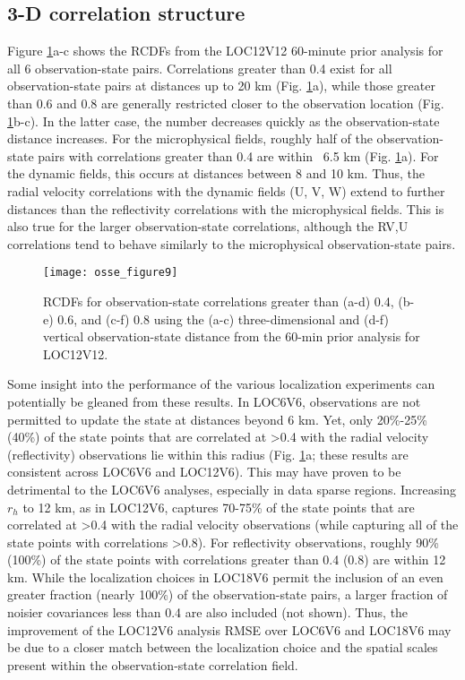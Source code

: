 \subsection{3-D correlation structure}
Figure \ref{osse_fig9}a-c shows the RCDFs from the LOC12V12 60-minute prior analysis for all 6 observation-state pairs. Correlations greater than 0.4 exist for all observation-state pairs at distances up to 20 km (Fig. \ref{osse_fig9}a), while those greater than 0.6 and 0.8 are generally restricted closer to the observation location (Fig. \ref{osse_fig9}b-c). In the latter case, the number decreases quickly as the observation-state distance increases. For the microphysical fields, roughly half of the observation-state pairs with correlations greater than 0.4 are within ~6.5 km (Fig. \ref{osse_fig9}a). For the dynamic fields, this occurs at distances between 8 and 10 km. Thus, the radial velocity correlations with the dynamic fields (U, V, W) extend to further distances than the reflectivity correlations with the microphysical fields. This is also true for the larger observation-state correlations, although the RV,U correlations tend to behave similarly to the microphysical observation-state pairs.

\begin{figure}
\centering
\texttt{[image: osse\_figure9]}
\caption{RCDFs for observation-state correlations greater than (a-d) 0.4, (b-e) 0.6, and (c-f) 0.8 using the (a-c) three-dimensional and (d-f) vertical observation-state distance from the 60-min prior analysis for LOC12V12.}
\label{osse_fig9}
\end{figure}

Some insight into the performance of the various localization experiments can potentially be gleaned from these results. In LOC6V6, observations are not permitted to update the state at distances beyond 6 km. Yet, only 20\%-25\% (40\%) of the state points that are correlated at \textgreater 0.4 with the radial velocity (reflectivity) observations lie within this radius (Fig. \ref{osse_fig9}a; these results are consistent across LOC6V6 and LOC12V6). This may have proven to be detrimental to the LOC6V6 analyses, especially in data sparse regions. Increasing \(r_h\) to 12 km, as in LOC12V6, captures 70-75\% of the state points that are correlated at \textgreater 0.4 with the radial velocity observations (while capturing all of the state points with correlations \textgreater 0.8). For reflectivity observations, roughly 90\% (100\%) of the state points with correlations greater than 0.4 (0.8) are within 12 km. While the localization choices in LOC18V6 permit the inclusion of an even greater fraction (nearly 100\%) of the observation-state pairs, a larger fraction of noisier covariances less than 0.4 are also included (not shown). Thus, the improvement of the LOC12V6 analysis RMSE over LOC6V6 and LOC18V6 may be due to a closer match between the localization choice and the spatial scales present within the observation-state correlation field.

